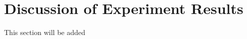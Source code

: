 \section{Discussion of Experiment Results}
\label{sec:exp_discuss}
This section will be added
%
%

\endgroup